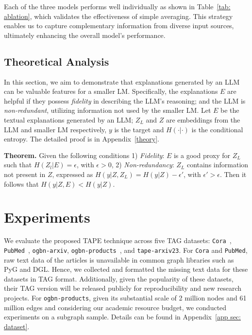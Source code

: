 \documentclass{article}
\begin{document}
Each of the three models performs well individually as shown in Table~\ref{tab: ablation}, which validates the effectiveness of simple averaging. This strategy enables us to capture complementary information from diverse input sources, ultimately enhancing the overall model's performance.

\subsection{Theoretical Analysis}\label{subsec: theorm}
In this section, we aim to demonstrate that explanations generated by an LLM can be valuable features for a smaller LM. Specifically, the explanations $E$ are helpful if they possess \emph{fidelity} in describing the LLM's reasoning; and the LLM is \emph{non-redundant}, utilizing information not used by the smaller LM. Let $E$ be the textual explanations generated by an LLM; $Z_L$ and $Z$ are embeddings from the LLM and smaller LM respectively, $y$ is the target and $H(\cdot |\cdot)$ is the conditional entropy. The detailed proof is in Appendix~\ref{theory}. 

\textbf{Theorem. }Given the following conditions 1) \emph{Fidelity}: $E$ is a good proxy for $Z_L$ such that $H(Z_l | E)=\epsilon$, with $\epsilon>0$,  2) \emph{Non-redundancy}: $Z_L$ contains information not present in $Z$, expressed as $H(y| Z, Z_L) = H(y|Z) - \epsilon'$, with $\epsilon'>\epsilon$. Then it follows that $H(y | Z, E) < H(y | Z)$.

\section{Experiments}

We evaluate the proposed TAPE technique across five TAG datasets: \texttt{Cora}~\citep{mccallum2000automating_cora}, \texttt{PubMed}~\citep{sen2008collective_pubmed}, \texttt{ogbn-arxiv}, \texttt{ogbn-products}~\citep{hu2020open}, and \texttt{tape-arxiv23}. 
For \texttt{Cora} and \texttt{PubMed}, raw text data of the articles is unavailable in common graph libraries such as PyG and DGL. Hence, we  collected and formatted the missing text data for these datasets in TAG format. Additionally, given the popularity of these datasets, their TAG version will be released publicly for reproducibility and new research projects.  For \texttt{ogbn-products}, given its substantial scale of 2 million nodes and 61 million edges and considering our academic resource budget, we conducted experiments on a subgraph sample. Details can be found in Appendix~\ref{app sec: dataset}.
\end{document}
